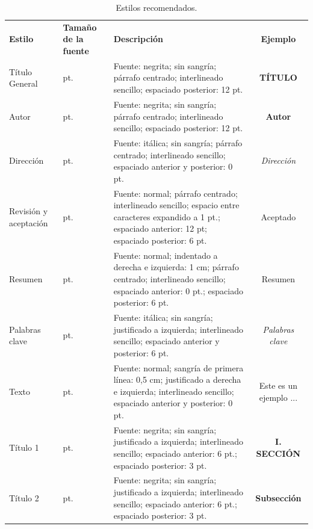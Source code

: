 \documentclass{analesafa}
\begin{document}
\begin{table}[ht]
\caption{Estilos recomendados.}
\label{tab_01}
    \centering
    \small
    \begin{tabular}{|m{2cm}|m{1.5cm}|m{7.8cm}|c|}
    \hline
    \centering
    \textbf{Estilo} & \centering\textbf{Tamaño de la fuente} & \centering\textbf{Descripción} & \textbf{Ejemplo} \\ 
    \thickhline
    \centering Título General & \centering 14 pt. & Fuente: negrita; sin sangría; párrafo centrado; interlineado sencillo; espaciado posterior: 12 pt.  &  \large\textbf{TÍTULO} \\ 
    \hline
    \centering Autor & \centering 11 pt. &  Fuente: negrita; sin sangría; párrafo centrado; interlineado sencillo; espaciado posterior: 12 pt. & \large\textbf{{Autor}} \\ 
    \hline
    \centering Dirección & \centering 9 pt. & Fuente: itálica; sin sangría; párrafo centrado; interlineado sencillo; espaciado anterior y posterior: 0 pt.  &  \small\textit{{Dirección}}\\
    \hline
    \centering Revisión y aceptación & \centering 9 pt.  & Fuente: normal; párrafo centrado; interlineado sencillo; espacio entre caracteres expandido a 1 pt.; espaciado anterior: 12 pt; espaciado posterior: 6 pt.  & \small{Aceptado}\\
    \hline
    \centering Resumen & \centering 9 pt. & Fuente: normal; indentado a derecha e izquierda: 1 cm; párrafo centrado; interlineado sencillo; espaciado anterior: 0 pt.; espaciado posterior: 6 pt.  & \small{Resumen}  \\
    \hline
    \centering Palabras clave  &  \centering 9 pt.  & Fuente: itálica; sin sangría; justificado a izquierda; interlineado sencillo; espaciado anterior y posterior: 6 pt.  & \small{\textit{Palabras clave}}  \\
    \hline
    \centering Texto  & \centering 10 pt.  & Fuente: normal; sangría de primera línea: 0,5 cm; justificado a derecha e izquierda; interlineado sencillo; espaciado anterior y posterior: 0 pt.  & Este es un ejemplo ...  \\
    \hline
    \centering Título 1  & \centering 10 pt. &  Fuente: negrita; sin sangría; justificado a izquierda; interlineado sencillo; espaciado anterior: 6 pt.; espaciado posterior: 3 pt.   &  \textbf{I. SECCIÓN} \\
    \hline
    \centering Título 2 & \centering 10 pt.  & Fuente: negrita; sin sangría; justificado a izquierda; interlineado sencillo; espaciado anterior: 6 pt.; espaciado posterior: 3 pt.  & \textbf{Subsección}  \\

\end{tabular}
\end{table}
\end{document}
